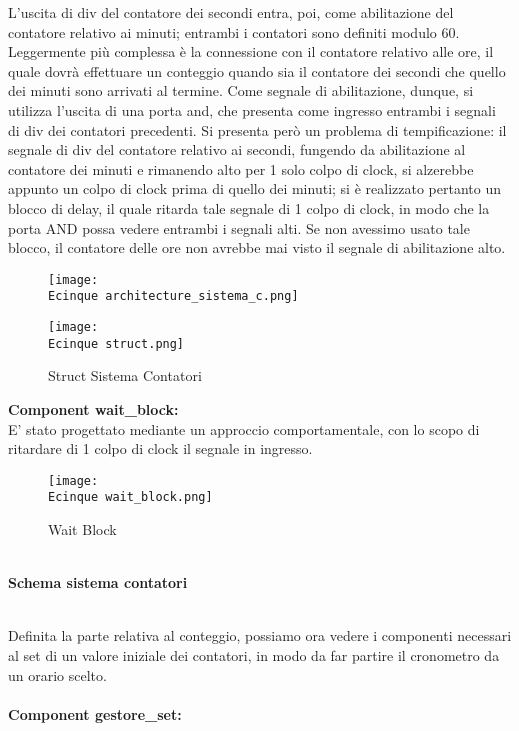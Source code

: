 \documentclass[12pt]{article}
\def \Ecinque {Allegati/Esercizio5/}
\begin{document}
L’uscita di div del contatore  dei secondi entra, poi, come abilitazione del contatore relativo ai minuti; entrambi i contatori sono definiti modulo 60.
Leggermente più complessa è la connessione con il contatore relativo alle ore, il quale dovrà effettuare un conteggio quando sia il contatore dei secondi che quello dei minuti sono arrivati al termine. Come segnale di abilitazione, dunque, si utilizza l’uscita di una porta and, che presenta come ingresso entrambi i segnali di div dei contatori precedenti.
Si presenta però un problema di tempificazione: il segnale di div del contatore relativo ai secondi, fungendo da abilitazione al contatore dei minuti e rimanendo alto per 1 solo colpo di clock, si alzerebbe appunto un colpo di clock prima di quello dei minuti; si è realizzato pertanto un blocco di delay, il quale ritarda tale segnale di 1 colpo di clock, in modo che la porta AND possa vedere entrambi i segnali alti. Se non avessimo usato tale blocco, il contatore delle ore non avrebbe mai visto il segnale di abilitazione alto.
\begin{figure}[ht]
    \centering
    \texttt{[image: \\Ecinque architecture\_sistema\_c.png]}
\end{figure}
\begin{figure}[ht!]
    \centering
    \texttt{[image: \\Ecinque struct.png]}
    \caption{Struct Sistema Contatori}
\end{figure}
\clearpage
{\large \textbf{Component wait\_block:}}
\\E' stato progettato mediante un approccio comportamentale, con lo scopo di ritardare di 1 colpo di clock il segnale in ingresso.
\begin{figure}[ht!]
    \centering
    \texttt{[image: \\Ecinque wait\_block.png]}
    \caption{Wait Block}
\end{figure}
\\{\large \textbf{Schema sistema contatori}}
\begin{figure}[ht!]
    \centering
    
\end{figure}
\\Definita la parte relativa al conteggio, possiamo ora vedere i componenti necessari al set di un valore iniziale dei contatori, in modo da far partire il cronometro da un orario scelto.
\\\\{\large \textbf{Component gestore\_set:}}
\end{document}
